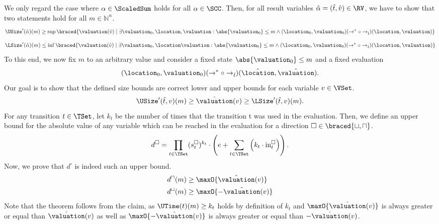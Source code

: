 We only regard the case where $\alpha \in \ScaledSum$ holds for all $\alpha \in \SCC$.
Then, for all result variables $\hat{\alpha} = (\hat{t}, \hat{v}) \in \RV$, we have to show that two statements hold for all $m \in \mathbb{N}^n$.
\[ \USize'(\hat{\alpha})(m) \geq \sup \braced{ \valuation(\hat{v}) \mid \exists \valuation_0, \location, \valuation: \abs{\valuation_0} \leq m \wedge (\location_0, \valuation_0) (\rightarrow^* \circ \rightarrow_{\hat{t}}) (\location, \valuation)} \]
\[ \LSize'(\hat{\alpha})(m) \leq \inf \braced{ \valuation(\hat{v}) \mid \exists \valuation_0, \location \valuation: \abs{\valuation_0} \leq m \wedge (\location_0, \valuation_0) (\rightarrow^* \circ \rightarrow_{\hat{t}}) (\location, \valuation)} \]
To this end, we now fix $m$ to an arbitrary value and consider a fixed state $\abs{\valuation_0} \leq m$ and a fixed evaluation
\[ (\location_0, \valuation_0) (\rightarrow^* \circ \rightarrow_{\hat{t}}) (\hat{\location}, \hat{\valuation}). \]
Our goal is to show that the defined size bounds are correct lower and upper bounds for each variable $v \in \VSet$.
\begin{equation} \label{eq:sizebound_target}
  \USize'(\hat{t}, v)(m) \geq \hat{\valuation}(v) \geq \LSize'(\hat{t}, v)(m).
\end{equation}
For any transition $t \in \TSet$, let $k_t$ be the number of times that the transition t was used in the evaluation.
Then, we define an upper bound for the absolute value of any variable which can be reached in the evaluation for a direction $\square \in \braced{\sqcup, \sqcap}$.
\[ d^\square = \prod_{t \in \TSet} (s^\square_t)^{k_t} \cdot \left( e + \sum_{t \in \TSet} \left( k_t \cdot \text{in}^\square_t \right) \right). \]
Now, we prove that $d^\square$ is indeed such an upper bound.
\begin{equation} \label{eq:sizebound_hypothesis}
  \begin{split}
    d^\sqcap(m) & \geq \maxO{\hat{\valuation}(v)} \\
    d^\sqcup(m) & \geq \maxO{-\hat{\valuation}(v)}
  \end{split}
\end{equation}
Note that the theorem follows from the claim, as $\UTime(t)(m) \geq k_t$ holds by definition of $k_t$ and $\maxO{\hat{\valuation}(v)}$ is always greater or equal than $\hat{\valuation}(v)$ as well as $\maxO{-\hat{\valuation}(v)}$ is always greater or equal than $-\hat{\valuation}(v)$.

